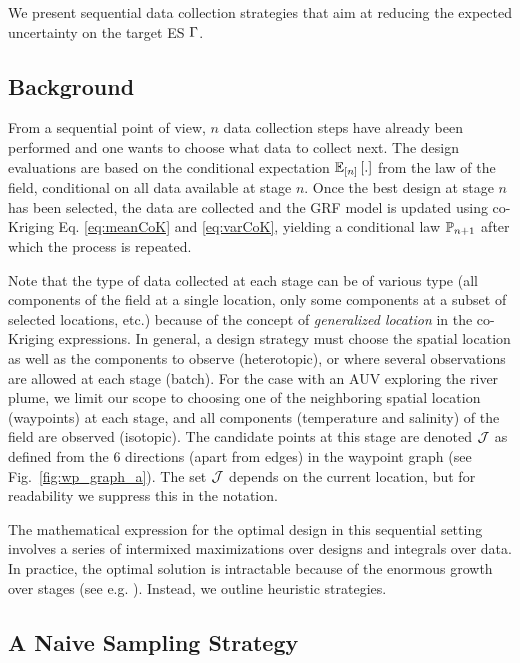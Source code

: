 \documentclass[aoas]{imsart}
\begin{document}
We present sequential data collection
strategies that aim at reducing the expected uncertainty on the target
ES $\Gamma$.

\subsection{Background}

From a sequential point of view, $n$ data collection steps have
already been performed and one wants to choose what data to collect
next. The design evaluations
are based on the conditional expectation $\mathbb{E}_{[n]} \left[.\right]$ from the law
of the field, conditional on all data available at
stage $n$.
Once the best design at stage $n$
has been selected, the data are collected and the GRF
model is updated using co-Kriging
Eq. \ref{eq:meanCoK} and \ref{eq:varCoK}, yielding a conditional law $\mathbb{P}_{n + 1}$
after which the process is repeated.

Note that the type of data collected at each stage can be of various
type (all components of the field at a single location, only some
components at a subset of selected locations, etc.) because of the
concept of \textit{generalized location} in the co-Kriging expressions.
In general, a design strategy must choose the spatial location as well
as the components to observe (heterotopic), or where several
observations are allowed at each stage (batch).  For the case with an
AUV exploring the river plume, we limit our scope to choosing one of
the neighboring spatial location (waypoints) at each stage, and all
components (temperature and salinity) of the field are observed
(isotopic). The candidate points at this stage are denoted
$\mathcal{J}$ as defined from the 6 directions (apart from edges) in
the waypoint graph (see Fig.~\ref{fig:wp_graph_a}). The
set $\mathcal{J}$ depends on the current location, but for readability
we suppress this in the notation.

The mathematical expression for the optimal design in this sequential
setting involves a series of intermixed maximizations over designs and
integrals over data. In practice, the optimal solution is intractable
because of the enormous growth over stages (see
e.g. \cite{powell2016perspectives}).
Instead, we outline heuristic strategies.


\subsection{A Naive Sampling Strategy}
\label{naive}
\end{document}
